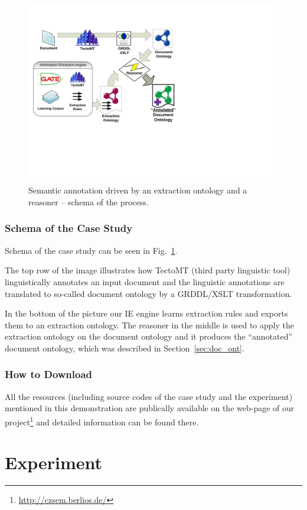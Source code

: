 \documentclass[10pt, conference, compsocconf]{IEEEtran}
\begin{document}
\begin{figure}
\centerline{\includegraphics[width=0.6\hsize]{semantic_rules_app_schema}}
\caption{Semantic annotation driven by an extraction ontology and a reasoner -- schema of the process.}
\label{img:rules_app_schema}
\end{figure}

\clearpage
\subsubsection{Schema of the Case Study}


Schema of the case study can be seen in Fig.~\ref{img:rules_app_schema}.  

The top row of the image illustrates how TectoMT (third party linguistic tool) linguistically annotates an input document and the linguistic annotations are translated to so-called document ontology by a GRDDL/XSLT transformation.

In the bottom of the picture our IE engine learns extraction rules and exports them to an extraction ontology. The reasoner in the middle is used to apply the extraction ontology on the document ontology and it produces the ``annotated'' document ontology, which was described in Section~\ref{sec:doc_ont}.




\subsubsection{How to Download}
All the resources (including source codes of the case study and the experiment) mentioned in this demonstration are publically available on the web-page of our project\footnote{\url{http://czsem.berlios.de/}} and detailed information can be found there.


\section{Experiment} \label{sec:experiment}
\end{document}
